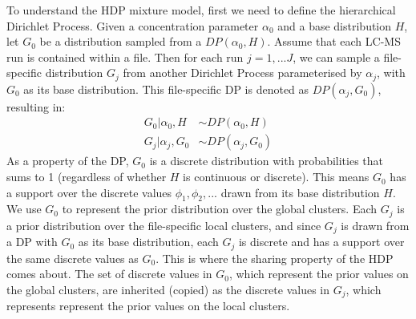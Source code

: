 To understand the HDP mixture model, first we need to define the hierarchical Dirichlet Process. Given a concentration parameter $\alpha_0$ and a base distribution $H$, let $G_0$ be a distribution sampled from a $DP(\alpha_0, H)$. Assume that each LC-MS run is contained within a file. Then for each run $j=1,...J$, we can sample a file-specific distribution $G_j$ from another Dirichlet Process parameterised by $\alpha_j$, with $G_0$ as its base distribution. This file-specific DP is denoted as $DP(\alpha_j, G_0)$, resulting in:
\begin{equation}
\begin{aligned}
G_0 \vert \alpha_0, H &\sim DP(\alpha_0, H) \\
G_j \vert \alpha_j, G_0 &\sim DP(\alpha_j, G_0)
\end{aligned}
\label{eq:background-hdp-process}
\end{equation}
As a property of the DP, $G_0$ is a discrete distribution with probabilities that sums to 1 (regardless of whether $H$ is continuous or discrete). This means $G_0$ has a support over the discrete values ${\phi_1, \phi_2, ... }$ drawn from its base distribution $H$. We use $G_0$ to represent the prior distribution over the global clusters. Each $G_j$ is a prior distribution over the file-specific local clusters, and since $G_j$ is drawn from a DP with $G_0$ as its base distribution, each $G_j$ is discrete and has a support over the same discrete values as $G_0$. This is where the sharing property of the HDP comes about. The set of discrete values in $G_0$, which represent the prior values on the global clusters, are inherited (copied) as the discrete values in $G_j$, which represents represent the prior values on the local clusters.

